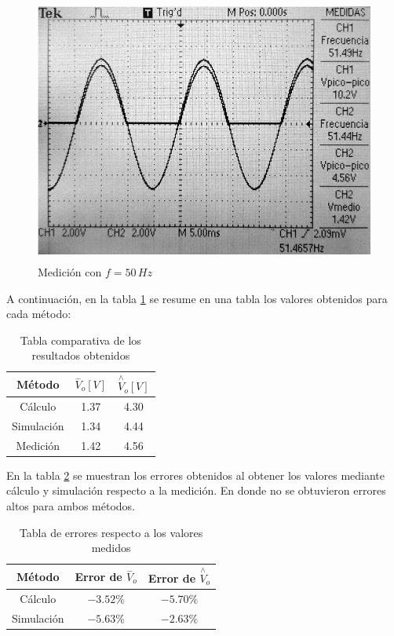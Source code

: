 \documentclass[10pt,spanish,a4paper,openany,notitlepage]{article}
\begin{document}
\begin{figure}[H]
\centering
\includegraphics[width=350pt, height=250pt]{mediciones/F-50Hz.jpg}
\caption{Medición con $f = 50\,\unit{Hz}$}
\label{fig:F_50_med}
\end{figure}

A continuación, en la tabla \ref{table:F_50} se resume en una tabla los valores obtenidos para cada método:

\begin{table}[H]
\centering
\begin{tabular}{|c|c|c|}
\hline
Método     & $\overset{-}{V}_{o} [\unit{V}] $  & $\overset{\wedge}{V}_{o} [\unit{V}]$ \\ \hline
Cálculo    & 1.37                   & 4.30  \\ \hline
Simulación & 1.34                   & 4.44  \\ \hline
Medición   & 1.42                   & 4.56  \\ \hline
\end{tabular}
\caption{Tabla comparativa de los resultados obtenidos}
\label{table:F_50}
\end{table}

En la tabla \ref{table:F_50_errores} se muestran los errores obtenidos
al obtener los valores mediante cálculo y simulación respecto a la medición.
En donde no se obtuvieron errores altos para ambos métodos.

\begin{table}[H]
\centering
\begin{tabular}{|c|c|c|}
\hline
Método     & Error de $\overset{-}{V}_{o}$  & Error de $\overset{\wedge}{V}_{o}$ \\ \hline
Cálculo    & $-3.52 \unit{\%} $             & $-5.70 \unit{\%} $  \\ \hline
Simulación & $-5.63 \unit{\%} $             & $-2.63 \unit{\%} $  \\ \hline
\end{tabular}
\caption{Tabla de errores respecto a los valores medidos}
\label{table:F_50_errores}
\end{table}
\end{document}
